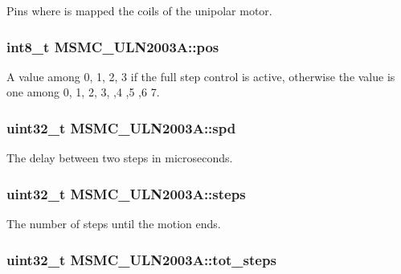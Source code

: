 Pins where is mapped the coils of the unipolar motor. 

\hypertarget{class_m_s_m_c___u_l_n2003_a_a8318f5fbce84ff22c9d800e6b637bf52}{
\subsubsection[{pos}]{\setlength{\rightskip}{0pt plus 5cm}int8\+\_\+t M\+S\+M\+C\+\_\+\+U\+L\+N2003\+A\+::pos\hspace{0.3cm}{\ttfamily [private]}}}\label{class_m_s_m_c___u_l_n2003_a_a8318f5fbce84ff22c9d800e6b637bf52}


A value among 0, 1, 2, 3 if the full step control is active, otherwise the value is one among 0, 1, 2, 3, ,4 ,5 ,6 7. 

\hypertarget{class_m_s_m_c___u_l_n2003_a_ab5cb8c78446fe371662f6ce6d2b289d5}{
\subsubsection[{spd}]{\setlength{\rightskip}{0pt plus 5cm}uint32\+\_\+t M\+S\+M\+C\+\_\+\+U\+L\+N2003\+A\+::spd\hspace{0.3cm}{\ttfamily [private]}}}\label{class_m_s_m_c___u_l_n2003_a_ab5cb8c78446fe371662f6ce6d2b289d5}


The delay between two steps in microseconds. 

\hypertarget{class_m_s_m_c___u_l_n2003_a_afc5c41c229b3d634bd4aea51dcef7599}{
\subsubsection[{steps}]{\setlength{\rightskip}{0pt plus 5cm}uint32\+\_\+t M\+S\+M\+C\+\_\+\+U\+L\+N2003\+A\+::steps\hspace{0.3cm}{\ttfamily [private]}}}\label{class_m_s_m_c___u_l_n2003_a_afc5c41c229b3d634bd4aea51dcef7599}


The number of steps until the motion ends. 

\hypertarget{class_m_s_m_c___u_l_n2003_a_a8e1a83575d5ad2d15a8a81eccf1bdba6}{
\subsubsection[{tot\+\_\+steps}]{\setlength{\rightskip}{0pt plus 5cm}uint32\+\_\+t M\+S\+M\+C\+\_\+\+U\+L\+N2003\+A\+::tot\+\_\+steps\hspace{0.3cm}{\ttfamily [private]}}}\label{class_m_s_m_c___u_l_n2003_a_a8e1a83575d5ad2d15a8a81eccf1bdba6}


